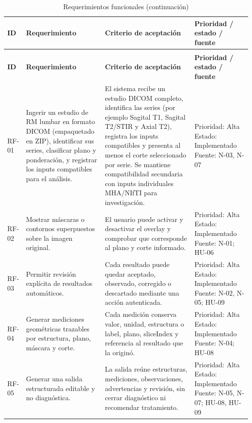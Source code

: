 {\scriptsize
\setlength{\LTleft}{0pt}
\setlength{\LTright}{0pt}
\setlength{\tabcolsep}{2pt}
\renewcommand{\arraystretch}{1.18}
\begin{longtable}{>{\raggedright\arraybackslash}p{} >{\raggedright\arraybackslash}p{} >{\raggedright\arraybackslash}p{} >{\raggedright\arraybackslash}p{}}
\caption{Requerimientos funcionales}\label{tab:req-funcionales}\\
\hline
\textbf{ID} & \textbf{Requerimiento} & \textbf{Criterio de aceptación} & \textbf{Prioridad / estado / fuente} \\
\hline
\endfirsthead
\caption[]{Requerimientos funcionales (continuación)}\\
\hline
\textbf{ID} & \textbf{Requerimiento} & \textbf{Criterio de aceptación} & \textbf{Prioridad / estado / fuente} \\
\hline
\endhead
\hline
\endfoot
RF-01 & Ingerir un estudio de RM lumbar en formato DICOM (empaquetado en ZIP), identificar sus series, clasificar plano y ponderación, y registrar los inputs compatibles para el análisis. & El sistema recibe un estudio DICOM completo, identifica las series (por ejemplo Sagital T1, Sagital T2/STIR y Axial T2), registra los inputs compatibles y presenta al menos el corte seleccionado por serie. Se mantiene compatibilidad secundaria con inputs individuales MHA/NIfTI para investigación. & Prioridad: Alta Estado: Implementado Fuente: N-03, N-07 \\
RF-02 & Mostrar máscaras o contornos superpuestos sobre la imagen original. & El usuario puede activar y desactivar el overlay y comprobar que corresponde al plano y corte informado. & Prioridad: Alta Estado: Implementado Fuente: N-01; HU-06 \\
RF-03 & Permitir revisión explícita de resultados automáticos. & Cada resultado puede quedar aceptado, observado, corregido o descartado mediante una acción autenticada. & Prioridad: Alta Estado: Implementado Fuente: N-02, N-05; HU-09 \\
RF-04 & Generar mediciones geométricas trazables por estructura, plano, máscara y corte. & Cada medición conserva valor, unidad, estructura o label, plano, sliceIndex y referencia al resultado que la originó. & Prioridad: Alta Estado: Implementado Fuente: N-04; HU-08 \\
RF-05 & Generar una salida estructurada editable y no diagnóstica. & La salida reúne estructuras, mediciones, observaciones, advertencias y revisión, sin cerrar diagnóstico ni recomendar tratamiento. & Prioridad: Alta Estado: Implementado Fuente: N-05, N-07; HU-08, HU-09 \\

\end{longtable}}
